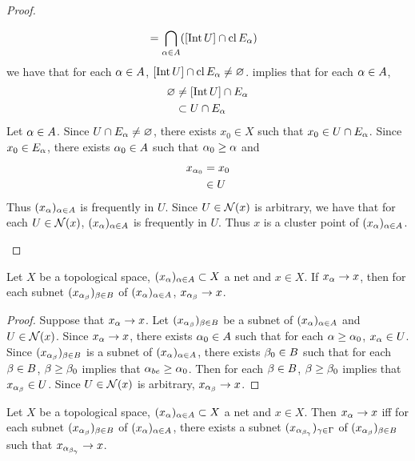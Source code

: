 \documentclass{book}
\begin{document}
\begin{proof}
\begin{itemize}
\begin{align*}
				& = \bigcap\limits_{\alpha \in A} ([\operatorname{Int} U] \cap \operatorname{cl} E_{\alpha} )
			\end{align*}
			we have that for each $\alpha \in A$, $[\operatorname{Int} U] \cap \operatorname{cl} E_{\alpha} \neq \varnothing$.  implies that for each $\alpha \in A$,
			\begin{align*}
				\varnothing 
				& \neq [\operatorname{Int} U] \cap E_{\alpha} \\
				& \subset U \cap E_{\alpha}
			\end{align*} 
			Let $\alpha \in A$. Since $U \cap E_{\alpha} \neq \varnothing$, there exists $x_0 \in X$ such that $x_0 \in U \cap E_{\alpha}$. Since $x_0 \in E_{\alpha}$, there exists $\alpha_0 \in A$ such that $\alpha_0 \geq \alpha$ and 
			\begin{align*}
				x_{\alpha_0} 
				& = x_0 \\
				& \in U
			\end{align*}
			Thus $(x_{\alpha})_{\alpha \in A}$ is frequently in $U$. Since $U \in \mathcal{N}(x)$ is arbitrary, we have that for each $U \in \mathcal{N}(x)$, $(x_{\alpha})_{\alpha \in A}$ is frequently in $U$. Thus $x$ is a cluster point of $(x_{\alpha})_{\alpha \in A}$.
		\end{itemize}
	\end{proof}
	
	\begin{ex} 
		Let $X$ be a topological space, $(x_{\alpha})_{\alpha \in A} \subset X$ a net and $x \in X$. If $x_{\alpha} \rightarrow x$, then for each subnet $(x_{\alpha_{\beta}})_{\beta \in B}$ of $(x_{\alpha})_{\alpha \in A}$, $x_{\alpha_{\beta}} \rightarrow x$.
	\end{ex}

	\begin{proof}
		Suppose that $x_{\alpha} \rightarrow x$. Let $(x_{\alpha_{\beta}})_{\beta \in B}$ be a subnet of $(x_{\alpha})_{\alpha \in A}$ and $U \in \mathcal{N}(x)$. Since $x_{\alpha} \rightarrow x$, there exists $\alpha_0 \in A$ such that for each $\alpha \geq \alpha_0$, $x_{\alpha} \in U$. Since $(x_{\alpha_{\beta}})_{\beta \in B}$ is a subnet of $(x_{\alpha})_{\alpha \in A}$, there exists $\beta_0 \in B$ such that for each $\beta \in B$, $\beta \geq \beta_0$ implies that $\alpha_{be} \geq \alpha_0$. Then for each $\beta \in B$, $\beta \geq \beta_0$ implies that $x_{\alpha_{\beta}} \in U$. Since $U \in \mathcal{N}(x)$ is arbitrary, $x_{\alpha_{\beta}} \rightarrow x$.
	\end{proof}
	
	\begin{ex} 
		Let $X$ be a topological space, $(x_{\alpha})_{\alpha \in A} \subset X$ a net and $x \in X$. Then $x_{\alpha} \rightarrow x$ iff for each subnet $(x_{\alpha_{\beta}})_{\beta \in B}$ of $(x_{\alpha})_{\alpha \in A}$, there exists a subnet $(x_{\alpha_{\beta_{\gamma}}})_{\gamma \in \Gamma}$ of $(x_{\alpha_{\beta}})_{\beta \in B}$ such that $x_{\alpha_{\beta_{\gamma}}} \rightarrow x$.  
	\end{ex}
\end{document}
